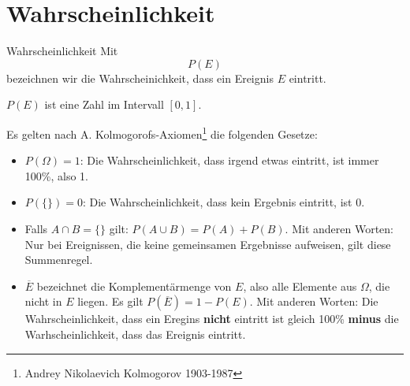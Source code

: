 
\section{Wahrscheinlichkeit}
\begin{definition}{Wahrscheinlichkeit}{}
Mit $$P(E)$$ bezeichnen wir die Wahrscheinichkeit, dass ein Ereignis $E$ eintritt.

$P(E)$ ist eine Zahl im Intervall $[0,1]$.
\end{definition}
Es gelten nach A. Kolmogorofs-Axiomen\footnote{Andrey Nikolaevich Kolmogorov 1903-1987} die folgenden Gesetze:
\begin{gesetz}{}{}
\begin{itemize}
\item $P(\Omega) = 1$: Die Wahrscheinlichkeit, dass irgend etwas eintritt, ist immer 100\%, also 1.
\item $P(\{\}) = 0$: Die Wahrscheinlichkeit, dass kein Ergebnis eintritt, ist 0.
\item Falls $A \cap B = \{\}$ gilt: $P(A\cup B) = P(A) + P(B)$. Mit anderen Worten: Nur bei Ereignissen, die keine gemeinsamen Ergebnisse aufweisen, gilt diese Summenregel.
\item $\overline{E}$ bezeichnet die Komplementärmenge von $E$, also alle Elemente aus $\Omega$, die nicht in $E$ liegen. Es gilt $P(\overline{E}) = 1-P(E)$. Mit anderen Worten: Die Wahrscheinlichkeit, dass ein Eregins \textbf{nicht} eintritt ist gleich 100\% \textbf{minus} die Warhscheinlichkeit, dass das Ereignis eintritt.
\end{itemize}
\end{gesetz}

\newpage

